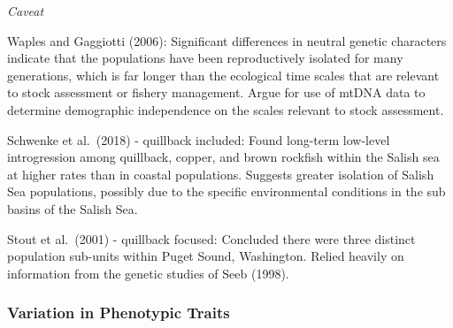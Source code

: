 \documentclass[11pt,
  english,
  letterpaper,
]{article}
\begin{document}
\leavevmode\tagmcend\tagstructend\par


\emph{Caveat}

\leavevmode\tagmcend\tagstructend\par


Waples and Gaggiotti {(2006)\leavevmode\tagmcend\tagstructend}: Significant differences in neutral genetic characters indicate that the populations have been reproductively isolated for many generations, which is far longer than the ecological time scales that are relevant to stock assessment or fishery management. Argue for use of mtDNA data to determine demographic independence on the scales relevant to stock assessment.

\leavevmode\tagmcend\tagstructend\par


Schwenke et al.~{(2018)\leavevmode\tagmcend\tagstructend} - quillback included: Found long-term low-level introgression among quillback, copper, and brown rockfish within the Salish sea at higher rates than in coastal populations. Suggests greater isolation of Salish Sea populations, possibly due to the specific environmental conditions in the sub basins of the Salish Sea.

\leavevmode\tagmcend\tagstructend\par


Stout et al.~{(2001)\leavevmode\tagmcend\tagstructend} - quillback focused: Concluded there were three distinct population sub-units within Puget Sound, Washington. Relied heavily on information from the genetic studies of Seeb {(1998)\leavevmode\tagmcend\tagstructend}.

\leavevmode\tagmcend\tagstructend\par


\hypertarget{variation-in-phenotypic-traits}{%
\subsubsection{Variation in Phenotypic Traits}\label{variation-in-phenotypic-traits}}
\end{document}
